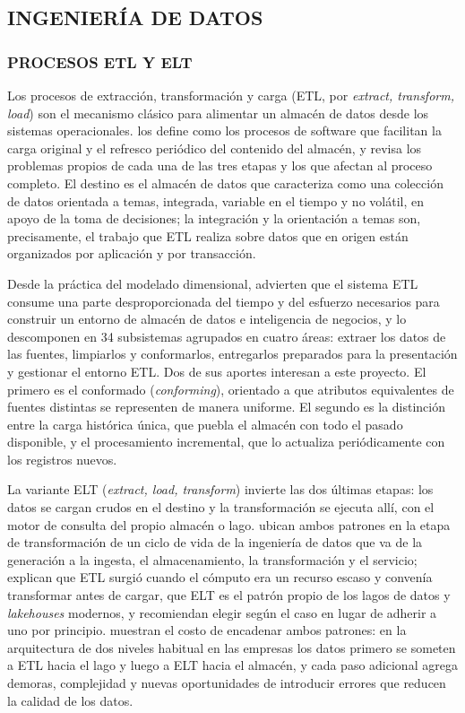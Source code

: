 \subsection{INGENIERÍA DE DATOS}
\subsubsection{PROCESOS ETL Y ELT}

Los procesos de extracción, transformación y carga (ETL, por \textit{extract, transform, load}) son el mecanismo clásico para alimentar un almacén de datos desde los sistemas operacionales. \textcite{Vassiliadis2009} los define como los procesos de software que facilitan la carga original y el refresco periódico del contenido del almacén, y revisa los problemas propios de cada una de las tres etapas y los que afectan al proceso completo. El destino es el almacén de datos que \textcite{Inmon2005} caracteriza como una colección de datos orientada a temas, integrada, variable en el tiempo y no volátil, en apoyo de la toma de decisiones; la integración y la orientación a temas son, precisamente, el trabajo que ETL realiza sobre datos que en origen están organizados por aplicación y por transacción.

Desde la práctica del modelado dimensional, \textcite{Kimball2013} advierten que el sistema ETL consume una parte desproporcionada del tiempo y del esfuerzo necesarios para construir un entorno de almacén de datos e inteligencia de negocios, y lo descomponen en 34 subsistemas agrupados en cuatro áreas: extraer los datos de las fuentes, limpiarlos y conformarlos, entregarlos preparados para la presentación y gestionar el entorno ETL\@. Dos de sus aportes interesan a este proyecto. El primero es el conformado (\textit{conforming}), orientado a que atributos equivalentes de fuentes distintas se representen de manera uniforme. El segundo es la distinción entre la carga histórica única, que puebla el almacén con todo el pasado disponible, y el procesamiento incremental, que lo actualiza periódicamente con los registros nuevos.

La variante ELT (\textit{extract, load, transform}) invierte las dos últimas etapas: los datos se cargan crudos en el destino y la transformación se ejecuta allí, con el motor de consulta del propio almacén o lago. \textcite{ReisHousley2022} ubican ambos patrones en la etapa de transformación de un ciclo de vida de la ingeniería de datos que va de la generación a la ingesta, el almacenamiento, la transformación y el servicio; explican que ETL surgió cuando el cómputo era un recurso escaso y convenía transformar antes de cargar, que ELT es el patrón propio de los lagos de datos y \textit{lakehouses} modernos, y recomiendan elegir según el caso en lugar de adherir a uno por principio. \textcite{Armbrust2021} muestran el costo de encadenar ambos patrones: en la arquitectura de dos niveles habitual en las empresas los datos primero se someten a ETL hacia el lago y luego a ELT hacia el almacén, y cada paso adicional agrega demoras, complejidad y nuevas oportunidades de introducir errores que reducen la calidad de los datos.

